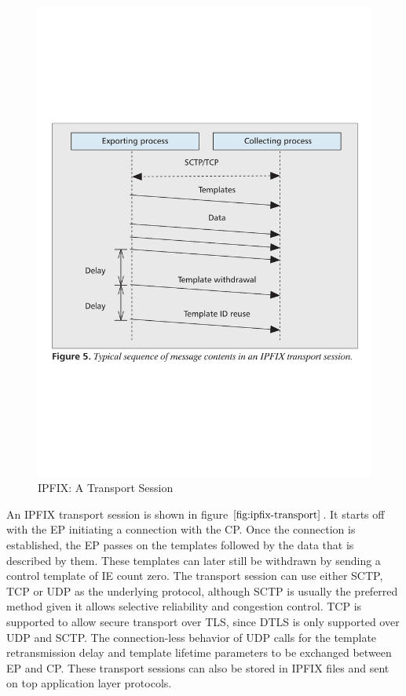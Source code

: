 \begin{figure}[h!]
\begin{center}
  \includegraphics* [width=0.7\linewidth]{figures/ipfix-transport}	
  \caption{IPFIX: A Transport Session \cite{btrammell:2011}}
  \label{fig:ipfix-transport}
\end{center}
\end{figure}
An \ac{IPFIX} transport session is shown in figure $\ref{fig:ipfix-transport}$. It starts off with the \ac{EP} initiating a connection with the \ac{CP}. Once the connection is established, the \ac{EP} passes on the templates followed by the data that is described by them. These templates can later still be withdrawn by sending a control template of \ac{IE} count zero. The transport session can use either \ac{SCTP}, \ac{TCP} or \ac{UDP} as the  underlying protocol, although \ac{SCTP} is usually the preferred method given it allows selective reliability and congestion control. \ac{TCP} is supported to allow secure transport over \ac{TLS}, since \ac{DTLS} is only supported over \ac{UDP} and \ac{SCTP}. The connection-less behavior of \ac{UDP} calls for the template retransmission delay and template lifetime parameters to be exchanged between \ac{EP} and \ac{CP}. These transport sessions can also be stored in \ac{IPFIX} files and sent on top application layer protocols. 

